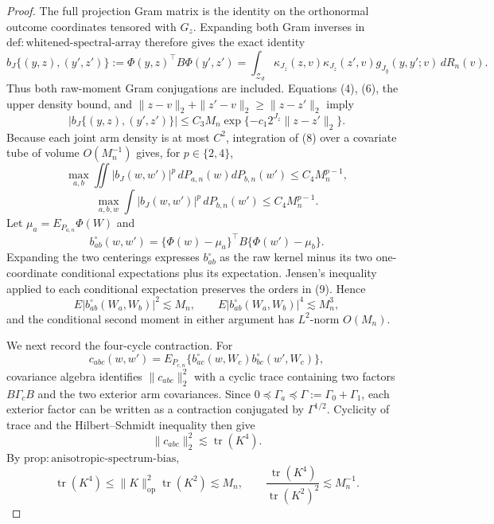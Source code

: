 \documentclass{article}
\begin{document}
\begin{proof}
The full projection Gram matrix is the identity on the orthonormal outcome coordinates tensored with \(G_z\). Expanding both Gram inverses in \(\mathrm{def{:}whitened\text{-}spectral\text{-}array}\) therefore gives the exact identity
\[
b_J\{(y,z),(y',z')\}
:=\Phi(y,z)^{\top}B\Phi(y',z')
=\int_{\mathcal Z_d}\kappa_{J_z}(z,v)\kappa_{J_z}(z',v)
g_{J_y}(y,y';v)\,dR_n(v). \tag{7}
\]
Thus both raw-moment Gram conjugations are included. Equations (4), (6), the upper density bound, and \(\|z-v\|_2+\|z'-v\|_2\ge\|z-z'\|_2\) imply
\[
|b_J\{(y,z),(y',z')\}|
\le C_3M_n\exp\{-c_1 2^{J_z}\|z-z'\|_2\}. \tag{8}
\]
Because each joint arm density is at most \(C^2\), integration of (8) over a covariate tube of volume \(O(M_n^{-1})\) gives, for \(p\in\{2,4\}\),
\[
\max_{a,b}\iint|b_J(w,w')|^p\,dP_{a,n}(w)dP_{b,n}(w')
\le C_4M_n^{p-1},
\]
\[
\max_{a,b,w}\int|b_J(w,w')|^p\,dP_{b,n}(w')
\le C_4M_n^{p-1}. \tag{9}
\]
Let \(\mu_a=E_{P_{a,n}}\Phi(W)\) and
\[
b_{ab}^{\circ}(w,w')=
\{\Phi(w)-\mu_a\}^{\top}B\{\Phi(w')-\mu_b\}.
\]
Expanding the two centerings expresses \(b_{ab}^{\circ}\) as the raw kernel minus its two one-coordinate conditional expectations plus its expectation. Jensen's inequality applied to each conditional expectation preserves the orders in (9). Hence
\[
E|b_{ab}^{\circ}(W_a,W_b)|^2\lesssim M_n,
\qquad
E|b_{ab}^{\circ}(W_a,W_b)|^4\lesssim M_n^3, \tag{10}
\]
and the conditional second moment in either argument has \(L^2\)-norm \(O(M_n)\).

We next record the four-cycle contraction. For
\[
c_{abc}(w,w')=E_{P_{c,n}}
\{b_{ac}^{\circ}(w,W_c)b_{bc}^{\circ}(w',W_c)\},
\]
covariance algebra identifies \(\|c_{abc}\|_2^2\) with a cyclic trace containing two factors \(B\Gamma_cB\) and the two exterior arm covariances. Since \(0\preceq\Gamma_a\preceq\Gamma:=\Gamma_0+\Gamma_1\), each exterior factor can be written as a contraction conjugated by \(\Gamma^{1/2}\). Cyclicity of trace and the Hilbert--Schmidt inequality then give
\[
\|c_{abc}\|_2^2\lesssim\operatorname{tr}(K^4).
\]
By \(\mathrm{prop{:}anisotropic\text{-}spectrum\text{-}bias}\),
\[
\operatorname{tr}(K^4)
\le\|K\|_{\mathrm{op}}^2\operatorname{tr}(K^2)\lesssim M_n,
\qquad
\frac{\operatorname{tr}(K^4)}{\operatorname{tr}(K^2)^2}\lesssim M_n^{-1}. \tag{11}
\]


\end{proof}
\end{document}
